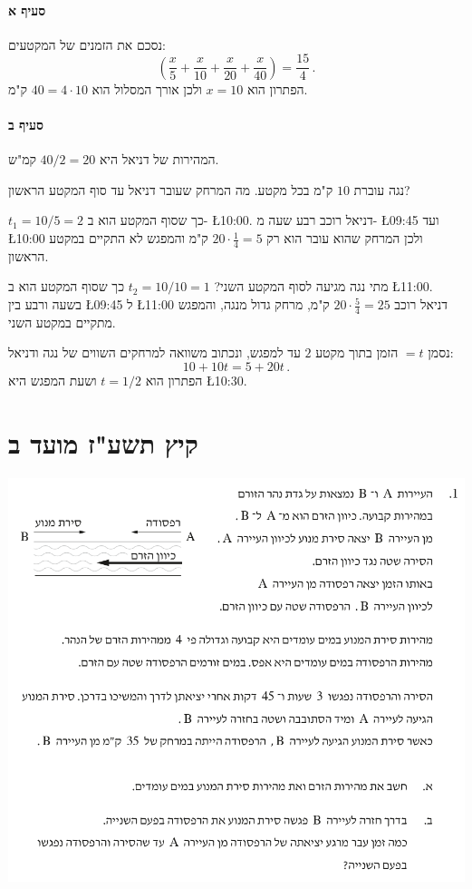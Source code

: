 \documentclass[12pt,a4paper]{article}
\newcommand*{\p}[1]{\textsf{\small #1}}
\begin{document}
\paragraph{סעיף א}
נסכם את הזמנים של המקטעים:
\[
\left(\frac{x}{5}+\frac{x}{10}+\frac{x}{20}+\frac{x}{40}\right) = \frac{15}{4}\,.
\]
הפתרון הוא
$x=10$
ולכן אורך המסלול הוא
$40=4\cdot 10$
ק"מ.
\newpage

\paragraph{סעיף ב}
המהירות של דניאל היא 
$40/2=20$
קמ"ש.

\smallskip

נגה עוברת
$10$
ק"מ בכל מקטע. מה המרחק שעובר דניאל עד סוף המקטע הראשון?

$t_1 = 10/5 = 2$
כך שסוף המקטע הוא ב- 
\L{\p{10:00}}.
דניאל רוכב רבע שעה מ-
\L{\p{09:45}}
ועד
\L{\p{10:00}}
ולכן המרחק שהוא עובר הוא רק
$20\cdot\frac{1}{4} = 5$
ק"מ והמפגש לא התקיים במקטע הראשון.

\smallskip

מתי נגה מגיעה לסוף המקטע השני?
$t_2=10/10 =1$
כך שסוף המקטע הוא ב
\L{\p{11:00}}.
בשעה ורבע בין 
\L{\p{09:45}}
ל
\L{\p{11:00}}
דניאל רוכב
$20\cdot \frac{5}{4}=25$
ק"מ, מרחק גדול מנגה, והמפגש מתקיים במקטע השני.

\smallskip

נסמן
$=t$
הזמן בתוך מקטע
$2$
עד למפגש, ונכתוב משוואה למרחקים השווים של נגה ודניאל:
\[
10 + 10t = 5 + 20t\,.
\]
הפתרון הוא
$t=1/2$
ושעת המפגש היא
\L{\p{10:30}}.

\newpage

\section*{קיץ תשע"ז מועד ב}

\begin{center}
\includegraphics[width=.9\textwidth]{summer-2017b-1}
\end{center}
\end{document}
